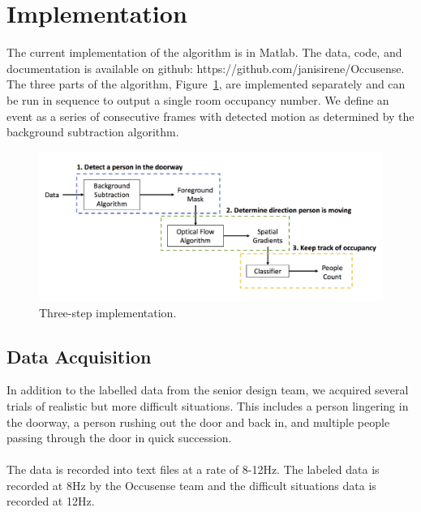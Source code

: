 \documentclass[12pt,oneside]{article} %
\begin{document}
\section{Implementation}  %
The current implementation of the algorithm is in Matlab. The data, code, and documentation is available
on github: https://github.com/janisirene/Occusense.
 The three parts of the algorithm, Figure~\ref{threestep},
are implemented
separately and can be run in sequence to output a single room occupancy number. We define an event as a series of consecutive frames with detected motion as determined by the background subtraction algorithm.
\begin{figure}[htb] %
\centering
\includegraphics[scale=0.2]{images/threestep.png}
\caption{Three-step implementation.}
\label{threestep}
\end{figure}

\subsection{Data Acquisition}  %
In addition to the labelled data from the senior design team, we acquired several trials of realistic but more
difficult situations. This includes a person lingering in the doorway, a person rushing out the door and back in, and multiple people passing through
the door in quick succession.
\\ \\
The data is recorded into text files at a rate of 8-12Hz. The labeled data is recorded at 8Hz
by the Occusense team and the difficult situations data is recorded at 12Hz.
\end{document}
